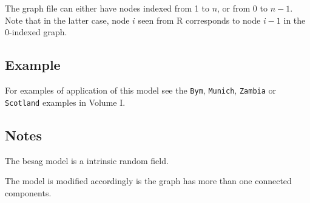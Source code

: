 \documentclass[a4paper,11pt]{article}
\begin{document}
The graph file can either have nodes indexed from 1 to $n$, or from 0
to $n-1$. Note that in the latter case, node $i$ seen from R
corresponds to node $i-1$ in the 0-indexed graph.



\subsection*{Example}

For examples of application of this model see the {\tt Bym}, {\tt Munich}, {\tt Zambia} or {\tt Scotland} examples in Volume I.

\subsection*{Notes}

The besag model is a intrinsic random field.

The model is modified accordingly is the graph has more than one
connected components.
\end{document}

